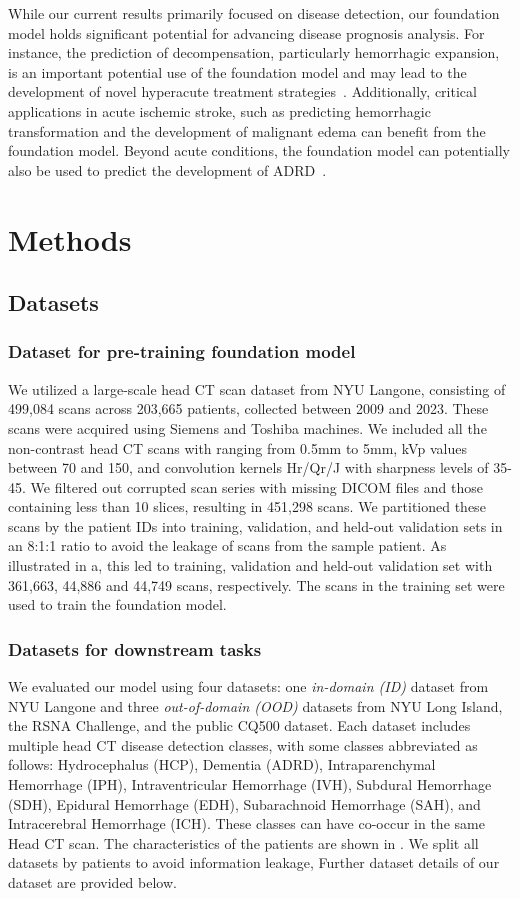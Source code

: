 \documentclass[fleqn,10pt]{wlscirep}
\begin{document}
While our current results primarily focused on disease detection, our foundation model holds significant potential for advancing disease prognosis analysis. For instance, the prediction of decompensation, particularly hemorrhagic expansion, is an important potential use of the foundation model and may lead to the development of novel hyperacute treatment strategies~\cite{hematoma_expansion}. Additionally, critical applications in acute ischemic stroke, such as predicting hemorrhagic transformation and the development of malignant edema can benefit from the foundation model. Beyond acute conditions, the foundation model can potentially also be used to predict the development of ADRD~\cite{Zhu2024-zd}.


\section*{Methods}
\label{sec:methods}
\subsection*{Datasets}
\subsubsection*{Dataset for pre-training foundation model}
We utilized a large-scale head CT scan dataset from NYU Langone, consisting of 499,084 scans across 203,665 patients, collected between 2009 and 2023. These scans were acquired using Siemens and Toshiba machines. We included all the non-contrast head CT scans with ranging from 0.5mm to 5mm, kVp values between 70 and 150, and convolution kernels Hr/Qr/J with sharpness levels of 35-45. We filtered out corrupted scan series with missing DICOM files and those containing less than 10 slices, resulting in 451,298 scans. We partitioned these scans by the patient IDs into training, validation, and held-out validation sets in an 8:1:1 ratio to avoid the leakage of scans from the sample patient. As illustrated in a, this led to training, validation and held-out validation set with 361,663, 44,886 and 44,749 scans, respectively. The scans in the training set were used to train the foundation model.

\subsubsection*{Datasets for downstream tasks}
We evaluated our model using four datasets: one \emph{in-domain (ID)} dataset from NYU Langone and three \emph{out-of-domain (OOD)} datasets from NYU Long Island, the RSNA Challenge, and the public CQ500 dataset. Each dataset includes multiple head CT disease detection classes, with some classes abbreviated as follows: Hydrocephalus (HCP), Dementia (ADRD), Intraparenchymal Hemorrhage (IPH), Intraventricular Hemorrhage (IVH), Subdural Hemorrhage (SDH), Epidural Hemorrhage (EDH), Subarachnoid Hemorrhage (SAH), and Intracerebral Hemorrhage (ICH). These classes can have co-occur in the same Head CT scan. The characteristics of the patients are shown in . We split all datasets by patients to avoid information leakage, Further dataset details of our dataset are provided below.
\end{document}
